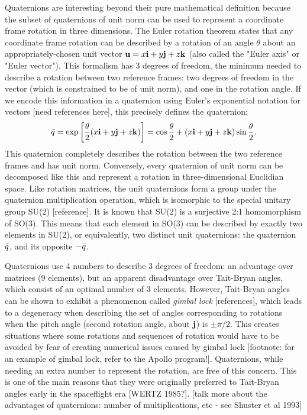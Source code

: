 Quaternions are interesting beyond their pure mathematical definition because the subset of quaternions of unit norm can be used to represent a coordinate frame rotation in three dimensions. The Euler rotation theorem states that any coordinate frame rotation can be described by a rotation of an angle $\theta$ about an appropriately-chosen unit vector $\textrm{\textbf{u}} = x\textrm{\textbf{i}} + y\textrm{\textbf{j}} + z\textrm{\textbf{k}}$ (also called the "Euler axis" or "Euler vector"). This formalism has 3 degrees of freedom, the minimum needed to describe a rotation between two reference frames: two degrees of freedom in the vector (which is constrained to be of unit norm), and one in the rotation angle. If we encode this information in a quaternion using Euler's exponential notation for vectors [need references here], this precisely defines the quaternion:
\begin{equation}
\bar{q} = \exp\left[\frac{\theta}{2}(x\textrm{\textbf{i}} + y\textrm{\textbf{j}} + z\textrm{\textbf{k}})\right] = \cos\frac{\theta}{2} + (x\textrm{\textbf{i}} + y\textrm{\textbf{j}} + z\textrm{\textbf{k}})\sin\frac{\theta}{2}.
\end{equation}
This quaternion completely describes the rotation between the two reference frames and has unit norm. Conversely, every quaternion of unit norm can be decomposed like this and represent a rotation in three-dimensional Euclidian space. Like rotation matrices, the unit quaternions form a group under the quaternion multiplication operation, which is isomorphic to the special unitary group SU(2) [reference]. It is known that SU(2) is a surjective 2:1 homomorphism of SO(3). This means that each element in SO(3) can be described by exactly two elements in SU(2), or equivalently, two distinct unit quaternions: the quaternion $\bar{q}$, and its opposite $-\bar{q}$.

Quaternions use 4 numbers to describe 3 degrees of freedom: an advantage over matrices (9 elements), but an apparent disadvantage over Tait-Bryan angles, which consist of an optimal number of 3 elements. However, Tait-Bryan angles can be shown to exhibit a phenomenon called \textit{gimbal lock} [references], which leads to a degeneracy when describing the set of angles corresponding to rotations when the pitch angle (second rotation angle, about $\textrm{\textbf{j}}$) is $\pm\pi/2$. This creates situations where some rotations and sequences of rotation would have to be avoided by fear of creating numerical issues caused by gimbal lock [footnote: for an example of gimbal lock, refer to the Apollo program!]. Quaternions, while needing an extra number to represent the rotation, are free of this concern. This is one of the main reasons that they were originally preferred to Tait-Bryan angles early in the spaceflight era [WERTZ 1985?]. [talk more about the advantages of quaternions: number of multiplications, etc - see Shuster et al 1993]

